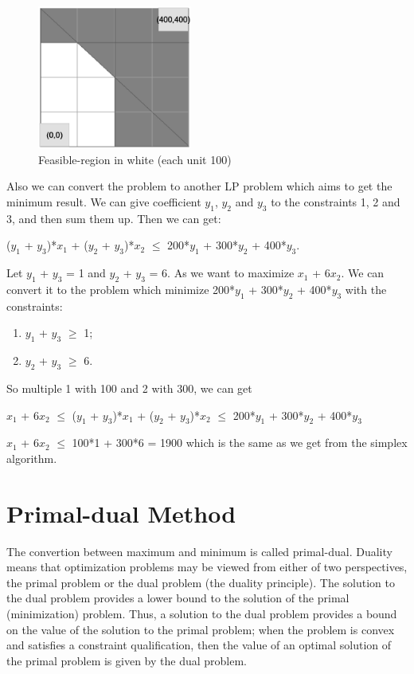 \documentclass[usletter]{article}
\begin{document}
\begin{figure}[bht]
\begin{center}
     \includegraphics[width=2.0in]{figures/feasible-region}
\caption{\label{fig:feasible-region}Feasible-region in white (each unit 100)}
\end{center}
\end{figure}

Also we can convert the problem to another LP problem which aims to get the minimum result.
We can give coefficient $y_{1}$, $y_{2}$ and $y_{3}$ to the constraints 1, 2 and 3, and then sum them up. Then we can get:

($y_{1}$ + $y_{3}$)*$x_{1}$ + ($y_{2}$ + $y_{3}$)*$x_{2}$ $\le$ 200*$y_{1}$ + 300*$y_{2}$ + 400*$y_{3}$.

Let $y_{1}$ + $y_{3}$ = 1 and $y_{2}$ + $y_{3}$ = 6. As we want to maximize $x_{1}$ + 6$x_{2}$. We can convert it to the problem which minimize 200*$y_{1}$ + 300*$y_{2}$ + 400*$y_{3}$ with the constraints:
\begin{enumerate}
	\item $y_{1}$ + $y_{3}$ $\geq$ 1;
	\item $y_{2}$ + $y_{3}$ $\geq$ 6.
\end{enumerate}

So multiple 1 with 100 and 2 with 300, we can get

$x_{1}$ + 6$x_{2}$ $\le$ ($y_{1}$ + $y_{3}$)*$x_{1}$ + ($y_{2}$ + $y_{3}$)*$x_{2}$ $\le$ 200*$y_{1}$ + 300*$y_{2}$ + 400*$y_{3}$

$x_{1}$ + 6$x_{2}$ $\le$ 100*1 + 300*6 = 1900 which is the same as we get from the simplex algorithm.

\section{Primal-dual Method}
The convertion between maximum and minimum is called primal-dual.  Duality means that optimization problems may be viewed from either of two perspectives, the primal problem or the dual problem (the duality principle).  The solution to the dual problem provides a lower bound to the solution of the primal (minimization) problem.  Thus, a solution to the dual problem provides a bound on the value of the solution to the primal problem; when the problem is convex and satisfies a constraint qualification, then the value of an optimal solution of the primal problem is given by the dual problem.
\end{document}
